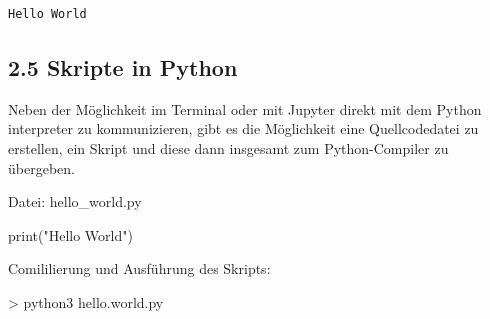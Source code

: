 \documentclass[
  11pt,
  a4paper,
  DIV=11,
  numbers=noendperiod]{scrartcl}
\newenvironment{Shaded}{\begin{snugshade}}{\end{snugshade}}
\newcommand{\BuiltInTok}[1]{\textcolor[rgb]{0.00,0.23,0.31}{#1}}
\newcommand{\NormalTok}[1]{\textcolor[rgb]{0.00,0.23,0.31}{#1}}
\newcommand{\StringTok}[1]{\textcolor[rgb]{0.13,0.47,0.30}{#1}}
\begin{document}
\begin{verbatim}
Hello World
\end{verbatim}

\subsection{2.5 Skripte in Python}\label{skripte-in-python}

Neben der Möglichkeit im Terminal oder mit Jupyter direkt mit dem Python
interpreter zu kommunizieren, gibt es die Möglichkeit eine
Quellcodedatei zu erstellen, ein Skript und diese dann insgesamt zum
Python-Compiler zu übergeben.

Datei: hello\_world.py

\begin{Shaded}
\begin{Highlighting}[numbers=left,,]
    \BuiltInTok{print}\NormalTok{(}\StringTok{"Hello World"}\NormalTok{)}
\end{Highlighting}
\end{Shaded}

Comililierung und Ausführung des Skripts:

\begin{Shaded}
\begin{Highlighting}[numbers=left,,]
\NormalTok{\textgreater{} python3 hello.world.py}
\end{Highlighting}
\end{Shaded}
\end{document}
